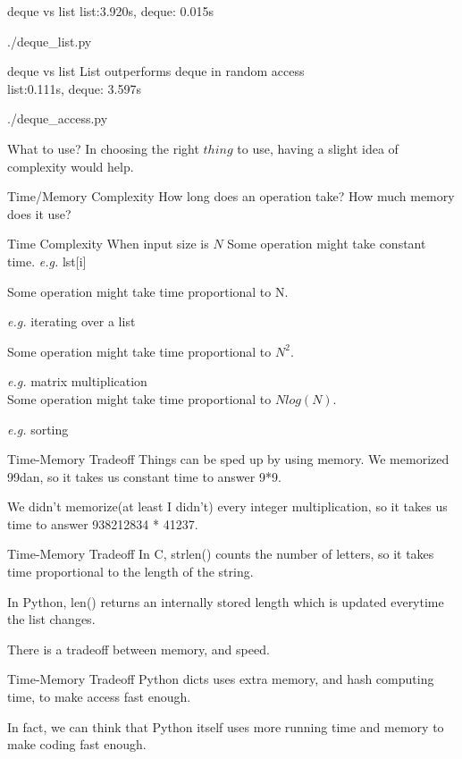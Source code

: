 \documentclass{beamer}
\begin{document}
\begin{frame}{deque vs list}
  list:3.920s, deque: 0.015s
  \begin{lstinputlisting}
    {./deque_list.py}
  \end{lstinputlisting}
\end{frame}


\begin{frame}{deque vs list}
  List outperforms deque in random access\\
  list:0.111s, deque: 3.597s
  \begin{lstinputlisting}
    {./deque_access.py}
  \end{lstinputlisting}
\end{frame}

\begin{frame}{What to use?}
  In choosing the right $thing$ to use, having a slight idea of complexity
  would help.
\end{frame}

\begin{frame}{Time/Memory Complexity}
  How long does an operation take? How much memory does it use?\\
\end{frame}

\begin{frame}{Time Complexity}
  When input size is $N$
  Some operation might take constant time. \textit{e.g.} lst[i]

  Some operation might take time proportional to N.

  \textit{e.g.} iterating over a list

  Some operation might take time proportional to $N^{2}$.

  \textit{e.g.} matrix multiplication\\

  Some operation might take time proportional to $Nlog(N)$.

  \textit{e.g.} sorting
\end{frame}

\begin{frame}{Time-Memory Tradeoff}
  Things can be sped up by using memory.
  We memorized 99dan, so it takes us constant time to answer 9*9.

  We didn't memorize(at least I didn't) every integer multiplication,
  so it takes us time to answer 938212834 * 41237.
\end{frame}

\begin{frame}{Time-Memory Tradeoff}
  In C, strlen() counts the number of letters, so it takes time proportional to the length of the string.

  In Python, len() returns an internally stored length which is updated everytime the list changes.

  There is a tradeoff between memory, and speed.
\end{frame}

\begin{frame}{Time-Memory Tradeoff}
  Python dicts uses extra memory, and hash computing time, to make
  access fast enough.

  In fact, we can think that Python itself uses more running time and memory to make coding fast enough.
\end{frame}
\end{document}
